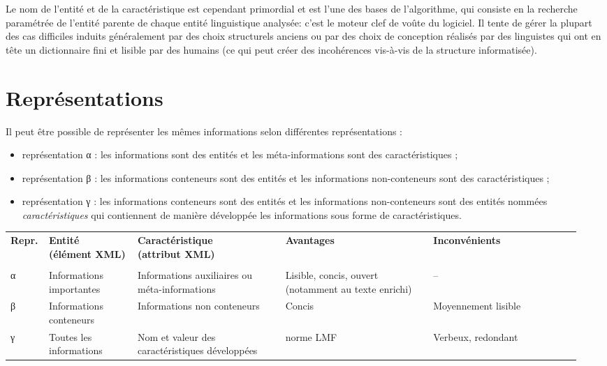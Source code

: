 \documentclass[10pt]{report}
\begin{document}
\bigskip

Le nom de l’entité et de la caractéristique est cependant primordial et est l’une des bases de l’algorithme, qui consiste en la recherche paramétrée de l’entité parente de chaque entité linguistique analysée: c’est le moteur clef de voûte du logiciel. Il tente de gérer la plupart des cas difficiles induits généralement par des choix structurels anciens ou par des choix de conception réalisés par des linguistes qui ont en tête un dictionnaire fini et lisible par des humains (ce qui peut créer des incohérences vis-à-vis de la structure informatisée).

\section{Représentations}

Il peut être possible de représenter les mêmes informations selon différentes représentations :
\begin{itemize}
	\item représentation α : les informations sont des entités et les méta-informations sont des caractéristiques ;
	\item représentation β : les informations conteneurs sont des entités et les informations non-conteneurs sont des caractéristiques ;
	\item représentation γ : les informations conteneurs sont des entités et les informations non-conteneurs sont des entités nommées \textit{caractéristiques} qui contiennent de manière développée les informations sous forme de caractéristiques.
\end{itemize}

\bigskip

\begin{tabular}{p{0.05\linewidth} p{0.15\linewidth} p{0.25\linewidth} p{0.25\linewidth} p{0.25\linewidth}}
\textbf{Repr.} & \shortstack{\textbf{Entité}\\\textbf{(élément XML)}} & \shortstack{\textbf{Caractéristique}\\\textbf{(attribut XML)}} & \textbf{Avantages} & \textbf{Inconvénients}\\
\\
α & Informations importantes & Informations auxiliaires ou méta-informations & Lisible, concis, ouvert (notamment au texte enrichi) & –\\
β & Informations conteneurs & Informations non conteneurs & Concis & Moyennement lisible\\
γ & Toutes les informations & Nom et valeur des caractéristiques développées & norme LMF & Verbeux, redondant\\
\end{tabular}
\end{document}
